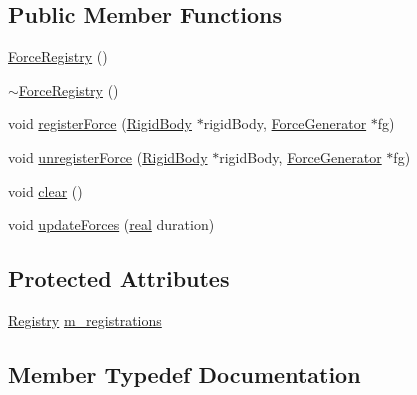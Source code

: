 \subsection*{Public Member Functions}
\begin{DoxyCompactItemize}
\item 
\mbox{\hyperlink{classrum_1_1_force_registry_aa45ab19bcf87ffb0f3dfc73dd7a3beac}{Force\+Registry}} ()
\item 
\mbox{\hyperlink{classrum_1_1_force_registry_aacf8096092db2532452f25e1a1a66515}{$\sim$\+Force\+Registry}} ()
\item 
void \mbox{\hyperlink{classrum_1_1_force_registry_a8aa91bdec15bc2f06f8fa331f7418c92}{register\+Force}} (\mbox{\hyperlink{classrum_1_1_rigid_body}{Rigid\+Body}} $\ast$rigid\+Body, \mbox{\hyperlink{classrum_1_1_force_generator}{Force\+Generator}} $\ast$fg)
\item 
void \mbox{\hyperlink{classrum_1_1_force_registry_ab4e2467560453bfbb700fdff9eee02ad}{unregister\+Force}} (\mbox{\hyperlink{classrum_1_1_rigid_body}{Rigid\+Body}} $\ast$rigid\+Body, \mbox{\hyperlink{classrum_1_1_force_generator}{Force\+Generator}} $\ast$fg)
\item 
void \mbox{\hyperlink{classrum_1_1_force_registry_a74b9f08c0fb87c8b49125fb98b6c347a}{clear}} ()
\item 
void \mbox{\hyperlink{classrum_1_1_force_registry_a5fe035c304a9f490332c3e7db423dfaa}{update\+Forces}} (\mbox{\hyperlink{namespacerum_a7e8cca23573d5eaead0f138cbaa4862c}{real}} duration)
\end{DoxyCompactItemize}
\subsection*{Protected Attributes}
\begin{DoxyCompactItemize}
\item 
\mbox{\hyperlink{classrum_1_1_force_registry_a4a52c8f9558a80eea2e47e328b687c77}{Registry}} \mbox{\hyperlink{classrum_1_1_force_registry_ab1f714dc80759abe5e34761d79b7ab8f}{m\+\_\+registrations}}
\end{DoxyCompactItemize}


\subsection{Member Typedef Documentation}
\mbox{\label{classrum_1_1_force_registry_a4a52c8f9558a80eea2e47e328b687c77}} 
